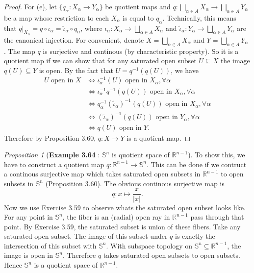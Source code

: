 \documentclass[a4paper]{article}
\theoremstyle{remark}
\newtheorem{prop}{Proposition}
\newcommand{\er}{\mathbb{R}} %
\newcommand{\subhim}{\subseteq} %
\begin{document}
\begin{proof}
	For (e), let $\{ q_{\alpha} : X_{\alpha} \to Y_{\alpha} \}$ be quotient maps and $q : \bigsqcup_{\alpha \in A} X_{\alpha} \to \bigsqcup_{\alpha \in A} Y_{\alpha} $ be a map whose restriction to each $X_{\alpha}$ is equal to $q_{\alpha}$. Technically, this means that $q|_{X_{\alpha}} = q \circ \iota_{\alpha} = \tilde{\iota}_{\alpha} \circ q_{\alpha}$, where $\iota_{\alpha} : X_{\alpha} \to \bigsqcup_{\alpha \in A} X_{\alpha}$ and $\tilde{\iota}_{\alpha} : Y_{\alpha} \to \bigsqcup_{\alpha \in A} Y_{\alpha}$ are the canonical injection. For convenient, denote $X= \bigsqcup_{\alpha \in A} X_{\alpha}$ and $Y=\bigsqcup_{\alpha \in A} Y_{\alpha}$ . The map $q$ is surjective and continous (by characteristic property). So it is a quotient map if we can show that for any saturated open subset $U \subhim X$ the image $q(U) \subhim Y$ is open. By the fact that $U = q^{-1}(q(U))$, we have
	\begin{align*}
	U \text{ open in }X &\Leftrightarrow \iota_{\alpha}^{-1}(U) \text{ open in }X_{\alpha}, \forall \alpha \\
	&\Leftrightarrow \iota_{\alpha}^{-1} q^{-1}(q(U)) \text{ open in }X_{\alpha}, \forall \alpha \\
	&\Leftrightarrow  q_{\alpha}^{-1} (\tilde{\iota}_{\alpha})^{-1}(q(U)) \text{ open in }X_{\alpha}, \forall \alpha \\
	&\Leftrightarrow (\tilde{\iota}_{\alpha})^{-1}(q(U)) \text{ open in }Y_{\alpha}, \forall \alpha \\
	&\Leftrightarrow q(U) \text{ open in }Y.
	\end{align*}
	Therefore by Proposition 3.60, $q : X \to Y$ is a quotient map.
\end{proof}




\begin{prop}[\textbf{Example 3.64 }: $\mathbb{S}^n$ is quotient space of $\mathbb{R}^{n-1}$]
	To show this, we have to construct a quotient map $q : \mathbb{R}^{n-1} \to \mathbb{S}^n$. This can be done if we contruct a continous surjective map which takes saturated open subsets in $\mathbb{R}^{n-1}$ to open subsets in $\mathbb{S}^n$ (Proposition 3.60). The obvious continous surjective map is
	$$
	q : x \mapsto \frac{x}{|x|}.
	$$
	Now we use Exercise 3.59 to observe whats the saturated open subset looks like. For any point in $\mathbb{S}^n$, the fiber is an (radial) open ray in $\mathbb{R}^{n-1}$ pass through that point. By Exercise 3.59, the saturated subset is union of these fibers. Take any saturated open subset. The image of this subset under $q$ is exactly the intersection of this subset with $\mathbb{S}^n$. With subspace topology on $\mathbb{S}^n \subhim \er^{n-1}$, the image is open in $\mathbb{S}^n$. Therefore $q$ takes saturated open subsets to open subsets. Hence $\mathbb{S}^n$ is a quotient space of $\er^{n-1}$.
\end{prop}
\end{document}

